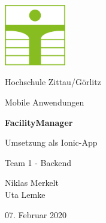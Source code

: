 \documentclass[12pt]{article}
\begin{document}
\begin{titlepage}
	\centering
	\includegraphics[width=0.2\textwidth]{Bilder/hszg}\par
	\vspace{1cm}
	{\LARGE Hochschule Zittau/Görlitz \par}
	\vspace{1cm}
	{\Large Mobile Anwendungen\par}
	\vspace{1.5cm}
	{\huge\bfseries FacilityManager \par}
	\vspace{0.75cm}
	{\LARGE Umsetzung als Ionic-App\par}
	\vspace{2cm}
	{\Large Team 1 - Backend\par}
	\vspace{0.75cm}
	{\Large Niklas Merkelt\\Uta Lemke\par}
	\vfill
	{\large 07. Februar 2020\par}
\end{titlepage}

\tableofcontents
\newpage
\end{document}
